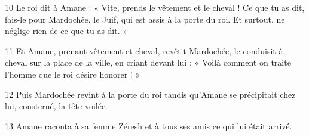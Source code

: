 
10 Le roi dit à Amane : « Vite, prends le vêtement et le cheval ! Ce que tu as dit, fais-le pour Mardochée, le Juif, qui est assis à la porte du roi. Et surtout, ne néglige rien de ce que tu as dit. »

11 Et Amane, prenant vêtement et cheval, revêtit Mardochée, le conduisit à cheval sur la place de la ville, en criant devant lui : « Voilà comment on traite l’homme que le roi désire honorer ! »

12 Puis Mardochée revint à la porte du roi tandis qu’Amane se précipitait chez lui, consterné, la tête voilée.

13 Amane raconta à sa femme Zéresh et à tous ses amis ce qui lui était arrivé.